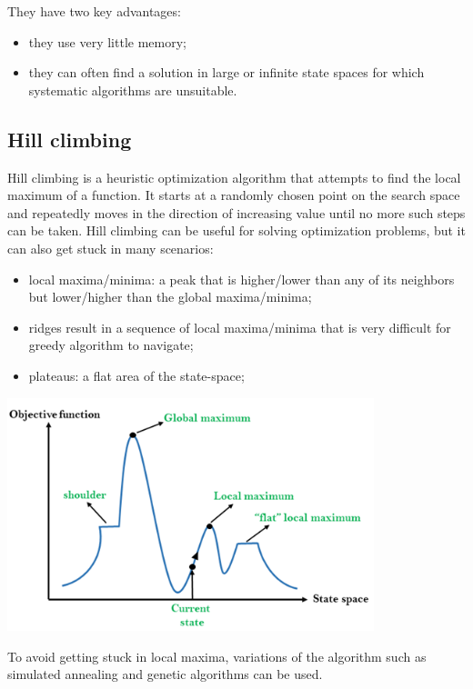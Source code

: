 \documentclass{article}
\begin{document}
They have two key advantages:

\begin{itemize}
    \item they use very little memory;
    \item they can often find a solution in large or infinite state spaces for which systematic algorithms are unsuitable.
\end{itemize}

\subsection{Hill climbing}

Hill climbing is a heuristic optimization algorithm that attempts to find the local maximum of a function. It starts at a randomly chosen point on the search space and repeatedly moves in the direction of increasing value until no more such steps can be taken. Hill climbing can be useful for solving optimization problems, but it can also get stuck in many scenarios: \\

\begin{itemize}
    \item local maxima/minima: a peak that is higher/lower than any of its neighbors but lower/higher than the global maxima/minima;
    \item ridges result in a sequence of local maxima/minima that is very difficult for greedy algorithm to navigate;
    \item plateaus: a flat area of the state-space;
\end{itemize}

\begin{center}
    \includegraphics[width=0.8\textwidth]{images/hill-climbing.png}    
\end{center}

To avoid getting stuck in local maxima, variations of the algorithm such as simulated annealing and genetic algorithms can be used.
\end{document}
